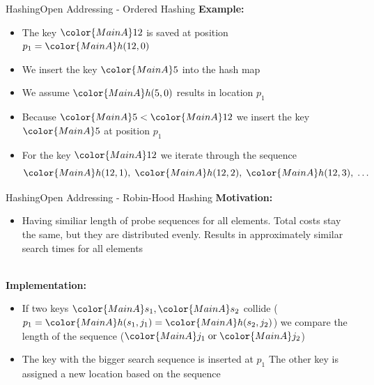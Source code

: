 
\begin{frame}{Hashing}{Open Addressing - Ordered Hashing}
  \textbf{Example:}
  \begin{itemize}
    \item
      The key ${\color{MainA}12}$ is saved at position
      $p_1 = {\color{MainA}h(12, 0)}$
    \item
      We insert the key ${\color{MainA}5}$ into the hash map
    \item
      We assume ${\color{MainA}h(5,0)}$ results in location $p_1$
    \item
      Because ${\color{MainA}5} < {\color{MainA}12}$ we insert
      the key ${\color{MainA}5}$ at position $p_1$
    \item
      For the key ${\color{MainA}12}$ we iterate through the sequence
      \begin{displaymath}
        {\color{MainA}h(12, 1)} ,\;
        {\color{MainA}h(12, 2)} ,\;
        {\color{MainA}h(12, 3)} ,\;
        \dots
      \end{displaymath}
  \end{itemize}
\end{frame}


\begin{frame}{Hashing}{Open Addressing - Robin-Hood Hashing}
  \textbf{Motivation:}
  \begin{itemize}
    \item <2->
      Having similiar length of probe sequences for all elements.
      Total costs stay the same, but they are distributed evenly.
      Results in approximately similar search times for all elements
  \end{itemize}
  \hfill\\[0.5em]
  \textbf{Implementation:}
  \begin{itemize}
    \item<4->
      If two keys ${\color{MainA}s_1}, {\color{MainA}s_2}$ collide
      (\begin{math}
        p_1 = {\color{MainA}h(s_1, j_1)}
            = {\color{MainA}h(s_2, j_2)}
      \end{math})
      we compare the length of the sequence
      (\begin{math}
        {\color{MainA}j_1} \;\text{or}\; {\color{MainA}j_2}
      \end{math})
    \item<5->
      The key with the bigger search sequence is inserted at $p_1$
      The other key is assigned a new location based on the sequence
  \end{itemize}
\end{frame}

